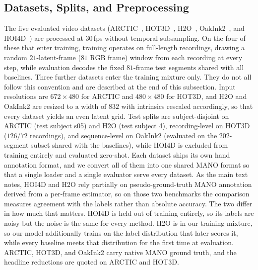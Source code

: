 \documentclass[10pt,twocolumn,letterpaper]{article}
\begin{document}
\subsection{Datasets, Splits, and Preprocessing}
The five evaluated video datasets (ARCTIC~\citep{arctic2023}, HOT3D~\citep{hot3d2024}, H2O~\citep{h2o2021}, OakInk2~\citep{oakink2_2024}, and HOI4D~\citep{hoi4d2022}) are processed at $30$\,fps without temporal subsampling. On the four of these that enter training, training operates on full-length recordings, drawing a random $21$-latent-frame ($81$ RGB frame) window from each recording at every step, while evaluation decodes the fixed $81$-frame test segments shared with all baselines. Three further datasets enter the training mixture only. They do not all follow this convention and are described at the end of this subsection. Input resolutions are $672\times480$ for ARCTIC and $480\times480$ for HOT3D, and H2O and OakInk2 are resized to a width of $832$ with intrinsics rescaled accordingly, so that every dataset yields an even latent grid. Test splits are subject-disjoint on ARCTIC (test subject s05) and H2O (test subject 4), recording-level on HOT3D ($126$/$72$ recordings), and sequence-level on OakInk2 (evaluated on the $202$-segment subset shared with the baselines), while HOI4D is excluded from training entirely and evaluated zero-shot. Each dataset ships its own hand annotation format, and we convert all of them into one shared MANO format so that a single loader and a single evaluator serve every dataset. As the main text notes, HOI4D and H2O rely partially on pseudo-ground-truth MANO annotation derived from a per-frame estimator, so on those two benchmarks the comparison measures agreement with the labels rather than absolute accuracy. The two differ in how much that matters. HOI4D is held out of training entirely, so its labels are noisy but the noise is the same for every method. H2O is in our training mixture, so our model additionally trains on the label distribution that later scores it, while every baseline meets that distribution for the first time at evaluation. ARCTIC, HOT3D, and OakInk2 carry native MANO ground truth, and the headline reductions are quoted on ARCTIC and HOT3D.
\end{document}
